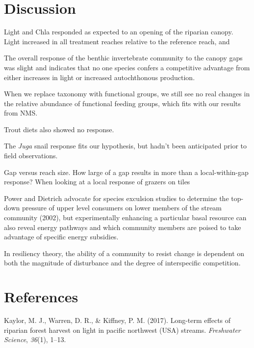 \documentclass[double,12pt]{beavtex}
\begin{document}
  \chapter*{Discussion}\label{discussion}
  
  Light and Chla responded as expected to an opening of the riparian
  canopy. Light increased in all treatment reaches relative to the
  reference reach, and
  
  The overall response of the benthic invertebrate community to the canopy
  gaps was slight and indicates that no one species confers a competitive
  advantage from either increases in light or increased autochthonous
  production.
  
  When we replace taxonomy with functional groups, we still see no real
  changes in the relative abundance of functional feeding groups, which
  fits with our results from NMS.
  
  Trout diets also showed no response.
  
  The \emph{Juga} snail response fits our hypothesis, but hadn't been
  anticipated prior to field observations.
  
  Gap versus reach size. How large of a gap results in more than a
  local-within-gap response? When looking at a local response of grazers
  on tiles
  
  Power and Dietrich advocate for species exculsion studies to determine
  the top-down pressure of upper level consumers on lower members of the
  stream community (2002), but experimentally enhancing a particular basal
  resource can also reveal energy pathways and which community members are
  poised to take advantage of specific energy subsidies.
  
  In resiliency theory, the ability of a community to resist change is
  dependent on both the magnitude of disturbance and the degree of
  interspecific competition.
  
  \pagebreak
  
  \chapter*{References}\label{references}
  
  \hypertarget{refs}{}
  \hypertarget{ref-Kaylor2017FS}{}
  Kaylor, M. J., Warren, D. R., \& Kiffney, P. M. (2017). Long-term
  effects of riparian forest harvest on light in pacific northwest (USA)
  streams. \emph{Freshwater Science}, \emph{36}(1), 1--13.
  
\end{document}

